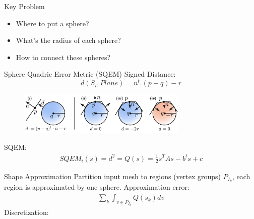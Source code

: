 \documentclass{beamer}
\begin{document}
\begin{frame}{Key Problem}
\begin{itemize}
\item Where to put a sphere?
\item What's the radius of each sphere?
\item How to connect these spheres?
\end{itemize}
\end{frame}


\begin{frame}{Sphere Quadric Error Metric (SQEM)}
Signed Distance:
\[d(S_i,Plane)=n^t.(p-q)-r\]
\begin{figure}
\vspace{-4mm}
\includegraphics[height=0.8in]{./img/distance.png}
\end{figure}
SQEM:
\begin{eqnarray}
SQEM_i(s) = d^2 = Q(s) = \frac{1}{2}s^TAs-b^ts+c
\end{eqnarray}
\end{frame}

\begin{frame}{Shape Approximation}
Partition input mesh to regions (vertex groups) $P_{I_k}$, each region is approximated by one sphere.
Approximation error:
\begin{eqnarray}
\sum_k \int_{v\in P_{I_k}} Q(s_k) dv
\end{eqnarray}
Discretization:
\end{frame}
\end{document}
